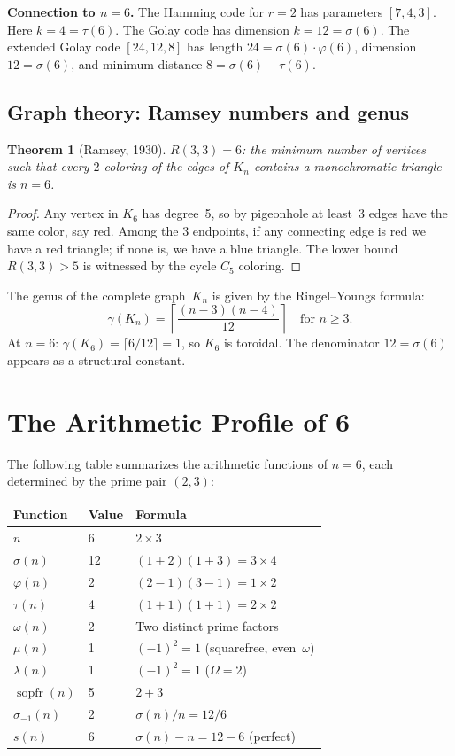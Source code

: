 \documentclass{amsart}
\newtheorem{theorem}{Theorem}[section]
\newcommand{\sopfr}{\operatorname{sopfr}}
\begin{document}
\textbf{Connection to $n = 6$.} The Hamming code for $r = 2$ has parameters $[7, 4, 3]$. Here $k = 4 = \tau(6)$. The Golay code has dimension $k = 12 = \sigma(6)$. The extended Golay code $[24, 12, 8]$ has length $24 = \sigma(6) \cdot \varphi(6)$, dimension $12 = \sigma(6)$, and minimum distance $8 = \sigma(6) - \tau(6)$.

\subsection{Graph theory: Ramsey numbers and genus}

\begin{theorem}[Ramsey, 1930]\label{thm:ramsey}
$R(3,3) = 6$: the minimum number of vertices such that every $2$-coloring of the edges of $K_n$ contains a monochromatic triangle is $n = 6$.
\end{theorem}

\begin{proof}
Any vertex in $K_6$ has degree~5, so by pigeonhole at least~3 edges have the same color, say red. Among the 3 endpoints, if any connecting edge is red we have a red triangle; if none is, we have a blue triangle. The lower bound $R(3,3) > 5$ is witnessed by the cycle $C_5$ coloring.
\end{proof}

The genus of the complete graph~$K_n$ is given by the Ringel--Youngs formula:
\[
\gamma(K_n) = \left\lceil \frac{(n-3)(n-4)}{12} \right\rceil \quad \text{for } n \geq 3.
\]
At $n = 6$: $\gamma(K_6) = \lceil 6/12 \rceil = 1$, so $K_6$ is toroidal. The denominator $12 = \sigma(6)$ appears as a structural constant.

\section{The Arithmetic Profile of 6}

The following table summarizes the arithmetic functions of $n = 6$, each determined by the prime pair $(2, 3)$:

\begin{center}
\begin{tabular}{lll}
\toprule
Function & Value & Formula \\
\midrule
$n$ & 6 & $2 \times 3$ \\
$\sigma(n)$ & 12 & $(1+2)(1+3) = 3 \times 4$ \\
$\varphi(n)$ & 2 & $(2-1)(3-1) = 1 \times 2$ \\
$\tau(n)$ & 4 & $(1+1)(1+1) = 2 \times 2$ \\
$\omega(n)$ & 2 & Two distinct prime factors \\
$\mu(n)$ & 1 & $(-1)^2 = 1$ (squarefree, even~$\omega$) \\
$\lambda(n)$ & 1 & $(-1)^2 = 1$ ($\Omega = 2$) \\
$\sopfr(n)$ & 5 & $2 + 3$ \\
$\sigma_{-1}(n)$ & 2 & $\sigma(n)/n = 12/6$ \\
$s(n)$ & 6 & $\sigma(n) - n = 12 - 6$ (perfect) \\
\bottomrule
\end{tabular}
\end{center}
\end{document}
